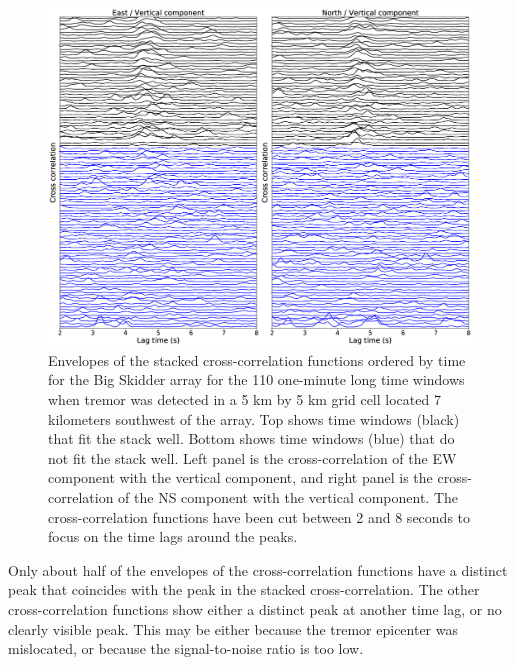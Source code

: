 \documentclass[draft]{agujournal2019}
\begin{document}
\begin{figure}
\noindent\includegraphics[width=\textwidth, trim={0cm 0cm 0cm 0cm},clip]{figures/BS_-05_-05_PWS_PWS_cluster_ccwin.eps}
\caption{Envelopes of the stacked cross-correlation functions ordered by time for the Big Skidder array for the 110 one-minute long time windows when tremor was detected in a 5 km by 5 km grid cell located 7 kilometers southwest of the array. Top shows time windows (black) that fit the stack well. Bottom shows time windows (blue) that do not fit the stack well. Left panel is the cross-correlation of the EW component with the vertical component, and right panel is the cross-correlation of the NS component with the vertical component. The cross-correlation functions have been cut between 2 and 8 seconds to focus on the time lags around the peaks.}
\label{pngfiguresample}
\end{figure}

Only about half of the envelopes of the cross-correlation functions have a distinct peak that coincides with the peak in the stacked cross-correlation. The other cross-correlation functions show either a distinct peak at another time lag, or no clearly visible peak. This may be either because the tremor epicenter was mislocated, or because the signal-to-noise ratio is too low. \\
\end{document}
